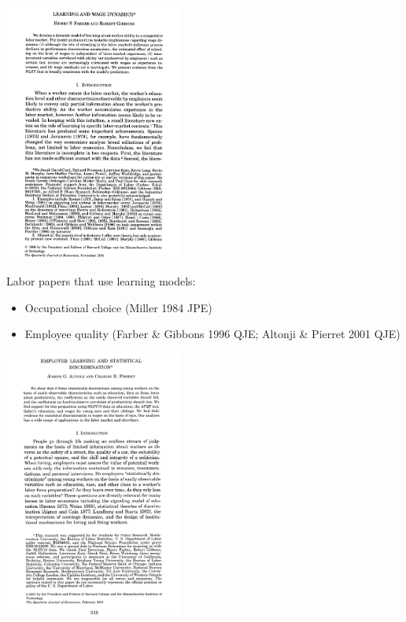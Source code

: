 \documentclass[aspectratio=169]{beamer}
\begin{document}
\begin{frame}
\centering
\includegraphics[width=0.44\textwidth]{Farber_Gibbons_1996_QJE_cover.jpg}
\end{frame}

\begin{frame}
Labor papers that use learning models:
\bigskip\par
\begin{itemize}
\itemsep1.5em
\item Occupational choice (Miller 1984 JPE)
\item Employee quality (Farber \& Gibbons 1996 QJE; Altonji \& Pierret 2001 QJE)
\end{itemize}
\end{frame}

\begin{frame}
\centering
\includegraphics[width=0.44\textwidth, angle=-0.5]{Altonji_Pierret_2001_QJE_cover.jpg}
\end{frame}
\end{document}
